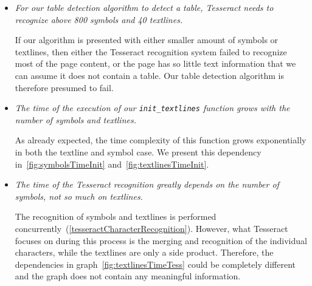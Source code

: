 \begin{itemize}
    \item \emph{For our table detection algorithm to detect a table, Tesseract needs to recognize above 800 symbols and 40 textlines.}
    
    If our algorithm is presented with either smaller amount of symbols or textlines, then either the Tesseract recognition system failed to recognize most of the page content, or the page has so little text information that we can assume it does not contain a table. Our table detection algorithm is therefore presumed to fail.

    \item \emph{The time of the execution of our \texttt{init\_textlines} function grows with the number of symbols and textlines.}
    
    As already expected, the time complexity of this function grows exponentially in both the textline and symbol case. We present this dependency in~\cref{fig:symbolsTimeInit} and~\cref{fig:textlinesTimeInit}.

    \item \emph{The time of the Tesseract recognition greatly depends on the number of symbols, not so much on textlines.}
    
    The recognition of symbols and textlines is performed concurrently~(\cref{tesseractCharacterRecognition}). However, what Tesseract focuses on during this process is the merging and recognition of the individual characters, while the textlines are only a side product. Therefore, the dependencies in graph~\cref{fig:textlinesTimeTess} could be completely different and the graph does not contain any meaningful information.
    
\end{itemize}

